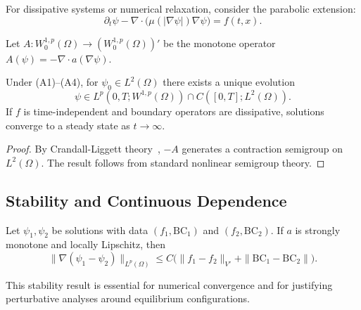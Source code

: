 For dissipative systems or numerical relaxation, consider the parabolic extension:
\begin{equation}
\partial_t\psi - \nabla \cdot \bigl(\mu(|\nabla\psi|)\nabla\psi\bigr) = f(t,x).
\end{equation}

Let $A: W^{1,p}_0(\Omega) \to (W^{1,p}_0(\Omega))'$ be the monotone operator 
$A(\psi) = -\nabla \cdot a(\nabla\psi)$.

\begin{theorem}\label{thm:parabolic-U}
Under (A1)--(A4), for $\psi_0 \in L^2(\Omega)$ there exists a unique evolution
\begin{equation}
\psi \in L^p(0,T; W^{1,p}(\Omega)) \cap C([0,T]; L^2(\Omega)).
\end{equation}
If $f$ is time-independent and boundary operators are dissipative, solutions 
converge to a steady state as $t \to \infty$.
\end{theorem}

\begin{proof}
By Crandall-Liggett theory~\cite{CrandallLiggett}, $-A$ generates a contraction 
semigroup on $L^2(\Omega)$. The result follows from standard nonlinear semigroup theory.
\end{proof}

\subsection{Stability and Continuous Dependence}\label{app:well-stability}

\begin{theorem}\label{thm:stability-U}
Let $\psi_1, \psi_2$ be solutions with data $(f_1, \mathrm{BC}_1)$ and 
$(f_2, \mathrm{BC}_2)$. If $a$ is strongly monotone and locally Lipschitz, then
\begin{equation}
\|\nabla(\psi_1 - \psi_2)\|_{L^p(\Omega)} \leq C\bigl(\|f_1 - f_2\|_{V'} 
+ \|\mathrm{BC}_1 - \mathrm{BC}_2\|\bigr).
\end{equation}
\end{theorem}

This stability result is essential for numerical convergence and for 
justifying perturbative analyses around equilibrium configurations.

